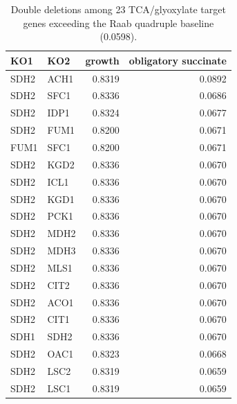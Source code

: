 \begin{longtable}{llrr}
\caption{Double deletions among 23 TCA/glyoxylate target genes exceeding the Raab quadruple baseline (0.0598).}\label{tab:pairs}\\
\hline\hline
KO1 & KO2 & growth & obligatory succinate\\
\hline
SDH2 & ACH1 & 0.8319 & 0.0892\\
SDH2 & SFC1 & 0.8336 & 0.0686\\
SDH2 & IDP1 & 0.8324 & 0.0677\\
SDH2 & FUM1 & 0.8200 & 0.0671\\
FUM1 & SFC1 & 0.8200 & 0.0671\\
SDH2 & KGD2 & 0.8336 & 0.0670\\
SDH2 & ICL1 & 0.8336 & 0.0670\\
SDH2 & KGD1 & 0.8336 & 0.0670\\
SDH2 & PCK1 & 0.8336 & 0.0670\\
SDH2 & MDH2 & 0.8336 & 0.0670\\
SDH2 & MDH3 & 0.8336 & 0.0670\\
SDH2 & MLS1 & 0.8336 & 0.0670\\
SDH2 & CIT2 & 0.8336 & 0.0670\\
SDH2 & ACO1 & 0.8336 & 0.0670\\
SDH2 & CIT1 & 0.8336 & 0.0670\\
SDH1 & SDH2 & 0.8336 & 0.0670\\
SDH2 & OAC1 & 0.8323 & 0.0668\\
SDH2 & LSC2 & 0.8319 & 0.0659\\
SDH2 & LSC1 & 0.8319 & 0.0659\\
\hline
\end{longtable}
